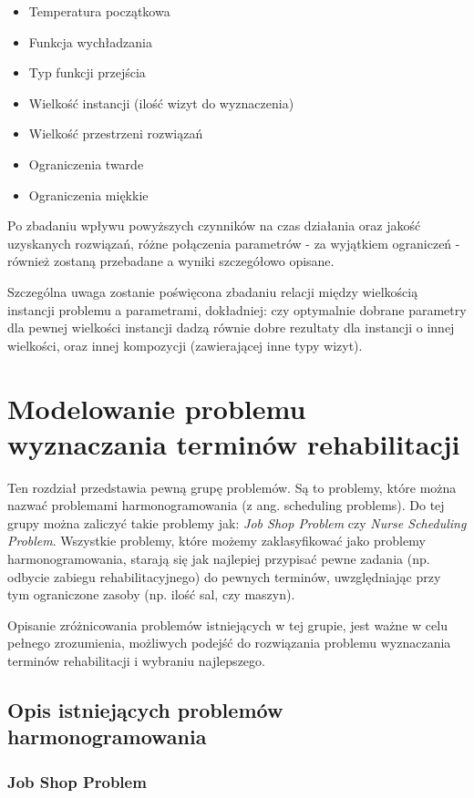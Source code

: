 \begin{itemize}
\item Temperatura początkowa
\item Funkcja wychładzania
\item Typ funkcji przejścia
\item Wielkość instancji (ilość wizyt do wyznaczenia)
\item Wielkość przestrzeni rozwiązań
\item Ograniczenia twarde
\item Ograniczenia miękkie
\end{itemize}
Po zbadaniu wpływu powyższych czynników na czas działania oraz jakość uzyskanych rozwiązań, różne połączenia parametrów - za wyjątkiem ograniczeń - również zostaną przebadane a wyniki szczegółowo opisane.

Szczególna uwaga zostanie poświęcona zbadaniu relacji między wielkością instancji problemu a parametrami, dokładniej: czy optymalnie dobrane parametry dla pewnej wielkości instancji dadzą równie dobre rezultaty dla instancji o innej wielkości, oraz innej kompozycji (zawierającej inne typy wizyt).

\chapter{Modelowanie problemu wyznaczania terminów rehabilitacji}
Ten rozdział przedstawia pewną grupę problemów. Są to problemy,
które można nazwać problemami harmonogramowania (z ang. scheduling problems).
Do tej grupy można zaliczyć takie problemy jak: \emph{Job Shop Problem} czy
\emph{Nurse Scheduling Problem}. Wszystkie problemy, które możemy zaklasyfikować
jako problemy harmonogramowania, starają się jak najlepiej przypisać pewne
zadania (np. odbycie zabiegu rehabilitacyjnego) do pewnych terminów, uwzględniając przy tym ograniczone zasoby (np. ilość
sal, czy maszyn).

Opisanie zróżnicowania problemów istniejących w tej grupie, jest ważne w celu pełnego
zrozumienia, możliwych podejść do rozwiązania problemu wyznaczania
terminów rehabilitacji i wybraniu najlepszego.

\section{Opis istniejących problemów harmonogramowania}
\subsection{Job Shop Problem}
